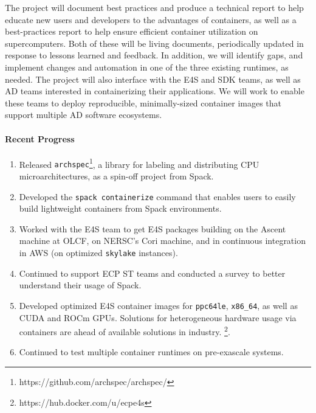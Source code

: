 The project will document best practices and produce a technical report
to help educate new users and developers to the advantages of containers,
as well as a best-practices report to help ensure efficient container
utilization on supercomputers. Both of these will be living
documents, periodically updated in response to lessons learned and
feedback.  In addition, we will identify gaps, and implement changes and
automation in one of the three existing runtimes, as needed.  The project
will also interface with the E4S and SDK teams, as well as AD teams
interested in containerizing their applications. We will work to enable
these teams to deploy reproducible, minimally-sized container images that
support multiple AD software ecosystems.

\paragraph{Recent Progress}

\begin{enumerate}
\item Released {\tt archspec}\footnote{https://github.com/archspec/archspec/},
      a library for labeling and distributing CPU microarchitectures, as a
      spin-off project from Spack.

\item Developed the {\tt spack containerize} command that enables users to
      easily build lightweight containers from Spack environments.

\item Worked with the E4S team to get E4S packages building on the Ascent
      machine at OLCF, on NERSC's Cori machine, and in continuous integration in
      AWS (on optimized {\tt skylake} instances).

\item Continued to support ECP ST teams and conducted a survey to better
      understand their usage of Spack.

\item Developed optimized E4S container images for {\tt ppc64le},
      {\tt x86\_64}, as well as CUDA and ROCm GPUs. Solutions for
      heterogeneous hardware usage via containers are ahead of available
      solutions in industry. \footnote{https://hub.docker.com/u/ecpe4s}.

\item Continued to test multiple container runtimes on pre-exascale systems.
\end{enumerate}

